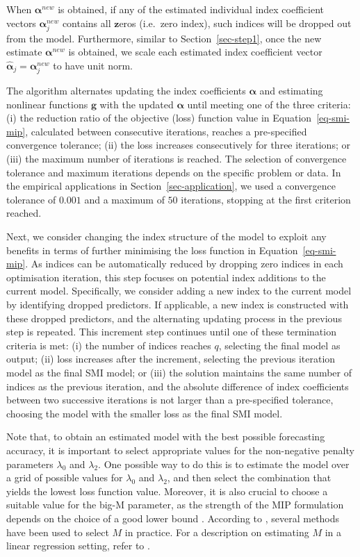 \documentclass[11pt,a4paper,]{article}
\begin{document}
When \(\bm{\alpha}^{new}\) is obtained, if any of the estimated
individual index coefficient vectors \(\bm{\alpha}_{j}^{new}\) contains
all \(\bm{z}\)eros (i.e.~zero index), such indices will be dropped out
from the model. Furthermore, similar to Section~\ref{sec-step1}, once
the new estimate \(\bm{\alpha}^{new}\) is obtained, we scale each
estimated index coefficient vector
\(\hat{\bm{\alpha}}_{j} = \bm{\alpha}_{j}^{new}\) to have unit norm.

The algorithm alternates updating the index coefficients \(\bm{\alpha}\)
and estimating nonlinear functions \(\bm{g}\) with the updated
\(\bm{\alpha}\) until meeting one of the three criteria: (i) the
reduction ratio of the objective (loss) function value in
Equation~\ref{eq-smi-mip}, calculated between consecutive iterations,
reaches a pre-specified convergence tolerance; (ii) the loss increases
consecutively for three iterations; or (iii) the maximum number of
iterations is reached. The selection of convergence tolerance and
maximum iterations depends on the specific problem or data. In the
empirical applications in Section~\ref{sec-application}, we used a
convergence tolerance of \(0.001\) and a maximum of \(50\) iterations,
stopping at the first criterion reached.

Next, we consider changing the index structure of the model to exploit
any benefits in terms of further minimising the loss function in
Equation~\ref{eq-smi-mip}. As indices can be automatically reduced by
dropping zero indices in each optimisation iteration, this step focuses
on potential index additions to the current model. Specifically, we
consider adding a new index to the current model by identifying dropped
predictors. If applicable, a new index is constructed with these dropped
predictors, and the alternating updating process in the previous step is
repeated. This increment step continues until one of these termination
criteria is met: (i) the number of indices reaches \(q\), selecting the
final model as output; (ii) loss increases after the increment,
selecting the previous iteration model as the final SMI model; or (iii)
the solution maintains the same number of indices as the previous
iteration, and the absolute difference of index coefficients between two
successive iterations is not larger than a pre-specified tolerance,
choosing the model with the smaller loss as the final SMI model.

Note that, to obtain an estimated model with the best possible
forecasting accuracy, it is important to select appropriate values for
the non-negative penalty parameters \(\lambda_{0}\) and \(\lambda_{2}\).
One possible way to do this is to estimate the model over a grid of
possible values for \(\lambda_{0}\) and \(\lambda_{2}\), and then select
the combination that yields the lowest loss function value. Moreover, it
is also crucial to choose a suitable value for the big-M parameter, as
the strength of the MIP formulation depends on the choice of a good
lower bound \autocite{Bertsimas2016}. According to
\textcite{Hazimeh2023}, several methods have been used to select \(M\)
in practice. For a description on estimating \(M\) in a linear
regression setting, refer to \textcite{Bertsimas2016}.
\end{document}

